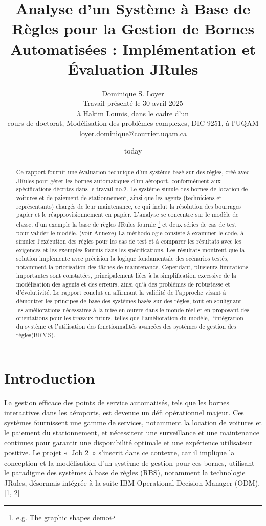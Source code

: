 \documentclass[11pt,a4paper]{article}
\title{Analyse d'un Système à Base de Règles pour la Gestion de Bornes Automatisées : Implémentation et Évaluation JRules} %
\author{Dominique S. Loyer\\
  Travail présenté le 30 avril 2025 \\
  à Hakim Lounis, dans le cadre d'un \\
  cours de doctorat, Modélisation des problèmes complexes, DIC-9251, à l'UQAM \\
  loyer.dominique@courrier.uqam.ca \\}
\date{today}
\begin{document}
\maketitle

\begin{abstract}
Ce rapport fournit une évaluation technique d'un système basé sur des règles, créé avec JRules pour gérer les bornes automatiques d'un aéroport, conformément aux spécifications décrites dans le travail no.2. Le système simule des bornes de location de voitures et de paiement de stationnement, ainsi que les agents (techniciens et représentants) chargés de leur maintenance, ce qui inclut la résolution des bourrages papier et le réapprovisionnement en papier. L'analyse se concentre sur le modèle de classe, d'un exemple la base de règles JRules fournie \footnote{e.g.  The graphic shapes demo} et deux séries de cas de test pour valider le modèle. (voir Annexe) La méthodologie consiste à examiner le code, à simuler l'exécution des règles pour les cas de test et à comparer les résultats avec les exigences et les exemples fournis dans les spécifications. Les résultats montrent que la solution implémente avec précision la logique fondamentale des scénarios testés, notamment la priorisation des tâches de maintenance. Cependant, plusieurs limitations importantes sont constatées, principalement liées à la simplification excessive de la modélisation des agents et des erreurs, ainsi qu'à des problèmes de robustesse et d'évolutivité. Le rapport conclut en affirmant la validité de l’approche visant à démontrer les principes de base des systèmes basés sur des règles, tout en soulignant les améliorations nécessaires à la mise en œuvre dans le monde réel et en proposant des orientations pour les travaux futurs, telles que l’amélioration du modèle, l’intégration du système et l’utilisation des fonctionnalités avancées des systèmes de gestion des règles(BRMS).
\end{abstract}

\section{Introduction}

La gestion efficace des points de service automatisés, tels que les bornes interactives dans les aéroports, est devenue un défi opérationnel majeur. Ces systèmes fournissent une gamme de services, notamment la location de voitures et le paiement du stationnement, et nécessitent une surveillance et une maintenance continues pour garantir une disponibilité optimale et une expérience utilisateur positive. Le projet « Job 2 » s'inscrit dans ce contexte, car il implique la conception et la modélisation d'un système de gestion pour ces bornes, utilisant le paradigme des systèmes à base de règles (RBS), notamment la technologie JRules, désormais intégrée à la suite IBM Operational Decision Manager (ODM).[1, 2]
\end{document}
